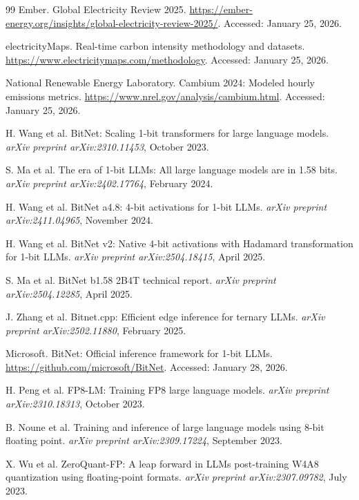\documentclass[11pt]{article}
\begin{document}
\begin{thebibliography}{99}
 Ember. Global Electricity Review 2025. \url{https://ember-energy.org/insights/global-electricity-review-2025/}. Accessed: January 25, 2026.

 electricityMaps. Real-time carbon intensity methodology and datasets. \url{https://www.electricitymaps.com/methodology}. Accessed: January 25, 2026.

 National Renewable Energy Laboratory. Cambium 2024: Modeled hourly emissions metrics. \url{https://www.nrel.gov/analysis/cambium.html}. Accessed: January 25, 2026.


 H. Wang et al. BitNet: Scaling 1-bit transformers for large language models. \textit{arXiv preprint arXiv:2310.11453}, October 2023.

 S. Ma et al. The era of 1-bit LLMs: All large language models are in 1.58 bits. \textit{arXiv preprint arXiv:2402.17764}, February 2024.

 H. Wang et al. BitNet a4.8: 4-bit activations for 1-bit LLMs. \textit{arXiv preprint arXiv:2411.04965}, November 2024.

 H. Wang et al. BitNet v2: Native 4-bit activations with Hadamard transformation for 1-bit LLMs. \textit{arXiv preprint arXiv:2504.18415}, April 2025.

 S. Ma et al. BitNet b1.58 2B4T technical report. \textit{arXiv preprint arXiv:2504.12285}, April 2025.

 J. Zhang et al. Bitnet.cpp: Efficient edge inference for ternary LLMs. \textit{arXiv preprint arXiv:2502.11880}, February 2025.

 Microsoft. BitNet: Official inference framework for 1-bit LLMs. \url{https://github.com/microsoft/BitNet}. Accessed: January 28, 2026.


 H. Peng et al. FP8-LM: Training FP8 large language models. \textit{arXiv preprint arXiv:2310.18313}, October 2023.

 B. Noune et al. Training and inference of large language models using 8-bit floating point. \textit{arXiv preprint arXiv:2309.17224}, September 2023.

 X. Wu et al. ZeroQuant-FP: A leap forward in LLMs post-training W4A8 quantization using floating-point formats. \textit{arXiv preprint arXiv:2307.09782}, July 2023.


\end{thebibliography}
\end{document}

